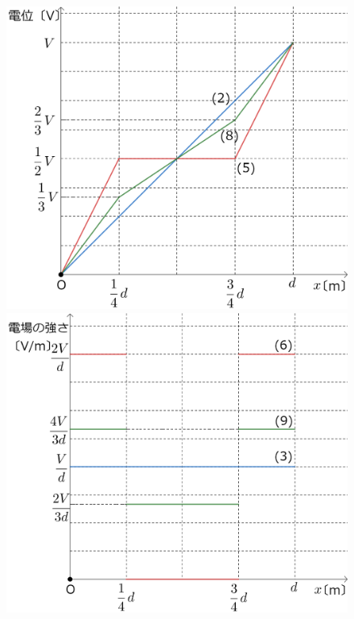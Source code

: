 \begin{figure}[htbp]
  \centering
  \begin{minipage}{0.4\columnwidth}
    \centering
    \includegraphics[width=\columnwidth]{../graphs/jumon_108_sol_2.png}
    \caption{}
  \end{minipage} 
  \begin{minipage}{0.4\columnwidth}
    \centering
    \includegraphics[width=\columnwidth]{../graphs/jumon_108_sol_3.png}
    \caption{}
  \end{minipage}
\end{figure}


